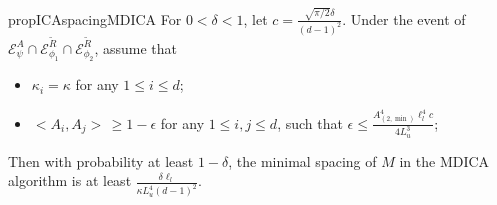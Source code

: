 \documentclass[11pt]{article}
\newcommand{\EA}[1]{\mathcal{E}^A_{#1}}
\newcommand{\Epsi}{\EA{\psi}}
\newcommand{\Ephione}{\mathcal{E}^{\tilde{R}}_{\phi_1}}
\newcommand{\Ephitwo}{\mathcal{E}^{\tilde{R}}_{\phi_2}}
\newcommand{\eps}{\epsilon}
\begin{document}
\begin{restatable}{prop}{ICAspacingMDICA}
	\label{prop:spacingMDICA}
	For $0<\delta <1$, let $c = \frac{\sqrt{\pi/2}\delta}{(d-1)^2}$. Under the event of $\Epsi\cap\Ephione\cap\Ephitwo$, assume that
	\begin{itemize}
		\item $\kappa_i = \kappa$ for any $1\le i\le d$;
		\item $<A_i, A_j> \,\ge 1-\eps$ for any $1\le i, j \le d$, such that $\eps \le \frac{A_{(2,\min)}^4\ell_l^4 c}{4L_u^3}$;
	\end{itemize}
	Then with probability at least $1-\delta$, the minimal spacing of $M$  in the MDICA algorithm is at least $\frac{\delta\ell_l}{\kappa L_u^4 (d-1)^2}$. 
\end{restatable}
\end{document}
